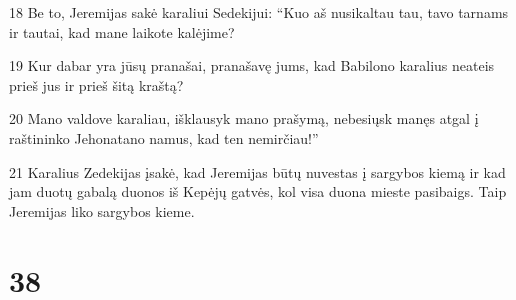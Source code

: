 \par 18 Be to, Jeremijas sakė karaliui Sedekijui: “Kuo aš nusikaltau tau, tavo tarnams ir tautai, kad mane laikote kalėjime? 
\par 19 Kur dabar yra jūsų pranašai, pranašavę jums, kad Babilono karalius neateis prieš jus ir prieš šitą kraštą? 
\par 20 Mano valdove karaliau, išklausyk mano prašymą, nebesiųsk manęs atgal į raštininko Jehonatano namus, kad ten nemirčiau!” 
\par 21 Karalius Zedekijas įsakė, kad Jeremijas būtų nuvestas į sargybos kiemą ir kad jam duotų gabalą duonos iš Kepėjų gatvės, kol visa duona mieste pasibaigs. Taip Jeremijas liko sargybos kieme.



\chapter{38}


